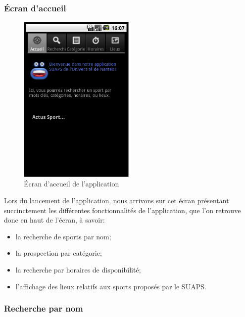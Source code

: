 \documentclass{article}
\begin{document}
		\subsubsection{Écran d'accueil}

		\begin{figure}[ht]
			\centering
			\includegraphics[width=0.5\textwidth]{accueil.png}
			\caption{Écran d'accueil de l'application}
			\label{fig:accueil}
		\end{figure}

		Lors du lancement de l'application, nous arrivons sur cet écran présentant
		succinctement les différentes fonctionnalités de l'application, que l'on
		retrouve donc en haut de l'écran, à savoir:

		\begin{itemize}
			\item la recherche de sports par nom;
			\item la prospection par catégorie;
			\item la recherche par horaires de disponibilité;
			\item l'affichage des lieux relatifs aux sports proposés par le SUAPS.
		\end{itemize}

		\subsubsection{Recherche par nom}
\end{document}

